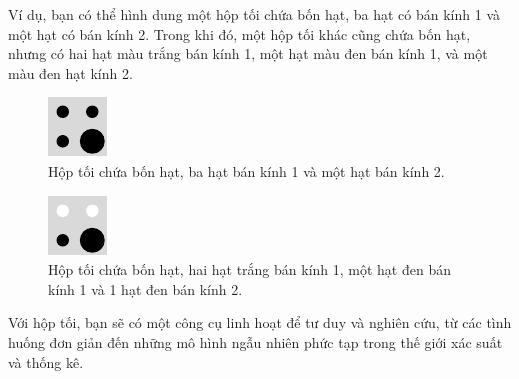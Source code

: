 \documentclass[12pt]{article} %
\begin{document}
Ví dụ, bạn có thể hình dung một hộp tối chứa bốn hạt, ba hạt có bán kính 1 và một hạt có bán kính 2. Trong khi đó, một hộp tối khác cũng chứa bốn hạt, nhưng có hai hạt màu trắng bán kính 1, một hạt màu đen bán kính 1, và một màu đen hạt kính 2.

\begin{figure}[h!]
    \centering
    \includegraphics{tex-images/hop_toi_4_hat_3_bk_1_va_1_bk_2/hop_toi_4_hat_3_bk_1_va_1_bk_2.pdf}
    \caption{Hộp tối chứa bốn hạt, ba hạt bán kính 1 và một hạt bán kính 2.}
    \label{fig:hop_toi_4_hat_3_bk_1_va_1_bk_2}
\end{figure}
\begin{figure}[h!]
    \centering
    \includegraphics{tex-images/hop_toi_4_hat_2_trang_bk_1_va_1_den__bk_1_va_1_den_bk_2/hop_toi_4_hat_2_trang_bk_1_va_1_den__bk_1_va_1_den_bk_2.pdf}
    \caption{Hộp tối chứa bốn hạt, hai hạt trắng bán kính 1, một hạt đen bán kính 1 và 1 hạt đen bán kính 2.}
    \label{fig:hop_toi_4_hat_2_trang_bk_1_va_1_den__bk_1_va_1_den_bk_2}
\end{figure}

Với hộp tối, bạn sẽ có một công cụ linh hoạt để tư duy và nghiên cứu, từ các tình huống đơn giản đến những mô hình ngẫu nhiên phức tạp trong thế giới xác suất và thống kê.
\end{document}
